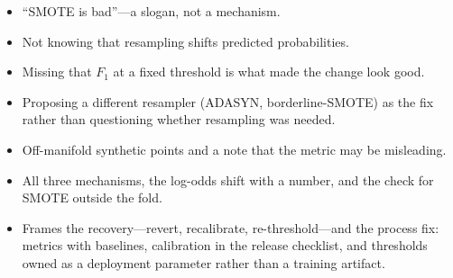 \begin{interviewq}
\redflags
\begin{itemize}
    \item ``SMOTE is bad''---a slogan, not a mechanism.
    \item Not knowing that resampling shifts predicted probabilities.
    \item Missing that $F_1$ at a fixed threshold is what made the change look good.
    \item Proposing a different resampler (ADASYN, borderline-SMOTE) as the fix rather than questioning whether resampling was needed.
\end{itemize}


\goodgreat
\begin{itemize}
    \item {} Off-manifold synthetic points and a note that the metric may be misleading.
    \item {} All three mechanisms, the log-odds shift with a number, and the check for SMOTE outside the fold.
    \item {} Frames the recovery---revert, recalibrate, re-threshold---and the process fix: metrics with baselines, calibration in the release checklist, and thresholds owned as a deployment parameter rather than a training artifact.
\end{itemize}

\end{interviewq}

